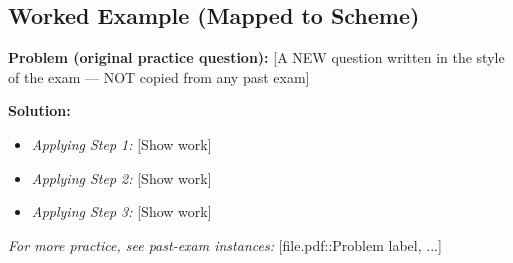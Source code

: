 \documentclass[12pt, a4paper]{article}
\begin{document}
\subsection*{Worked Example (Mapped to Scheme)}
\textbf{Problem (original practice question):} [A NEW question written in the style of the exam --- NOT copied from any past exam]

\textbf{Solution:}
\begin{itemize}
    \item \textit{Applying Step 1:} [Show work]
    \item \textit{Applying Step 2:} [Show work]
    \item \textit{Applying Step 3:} [Show work]
\end{itemize}

\textit{For more practice, see past-exam instances:} [file.pdf::Problem label, ...]

\end{document}
